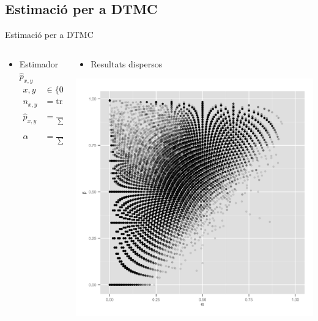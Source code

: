 \documentclass[xcolor=x11names,
								compress,
								aspectratio=1610]{beamer}
\theoremstyle{definition}%
\renewcommand{\(}{\begin{columns}}
\renewcommand{\)}{\end{columns}}
\newcommand{\<}[1]{\begin{column}{#1}}
\renewcommand{\>}{\end{column}}
\begin{document}
\subsection{Estimació per a DTMC}
\begin{frame}{Estimació per a DTMC}
	\begin{columns}[onlytextwidth]
		\begin{column}{.5\textwidth}
			\begin{itemize}
			\item Estimador $\widehat{p}_{x,y}$
			\begin{align*}
				x,y & \in \{0,1\} \\
				n_{x,y} & = \text{transicions } x \rightarrow y  \\
      	\widehat{p}_{x,y} & = \frac{n_{x,y}}{ \displaystyle \sum_{z \in \{0,1\}} n_{x,z}} \\ 
      \alpha & = \frac{n_{0,1}}{ \displaystyle \sum_{z \in \{0,1\}} n_{0,z}} \quad
      \beta  = \frac{n_{1,1}}{ \displaystyle \sum_{z \in \{0,1\}} n_{1,z}}
      \end{align*}
			\end{itemize}
		\end{column}
		\begin{column}{.5\textwidth}
			\begin{itemize}
			\item Resultats dispersos
			\end{itemize}
			\includegraphics[width=.9\textwidth]{mc_params_days}
		\end{column}
	\end{columns}
\end{frame}
\end{document}
